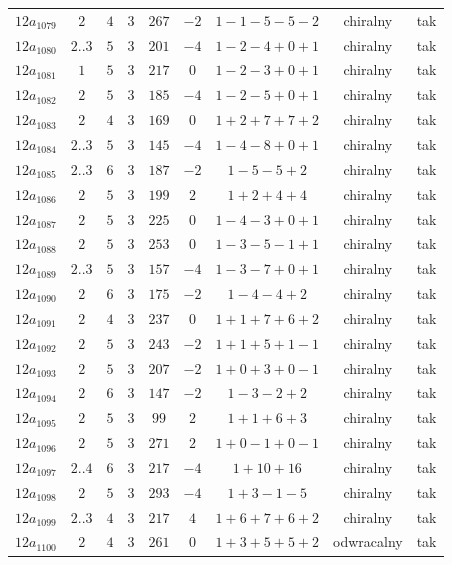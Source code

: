 \begin{longtable}{ccccccccc}
$12a_{1079}$ & $2$ & $4$ & $3$ & $267$ & $-2$ & $1-1-5-5-2$ & chiralny & tak \\
$12a_{1080}$ & $2..3$ & $5$ & $3$ & $201$ & $-4$ & $1-2-4+0+1$ & chiralny & tak \\
$12a_{1081}$ & $1$ & $5$ & $3$ & $217$ & $0$ & $1-2-3+0+1$ & chiralny & tak \\
$12a_{1082}$ & $2$ & $5$ & $3$ & $185$ & $-4$ & $1-2-5+0+1$ & chiralny & tak \\
$12a_{1083}$ & $2$ & $4$ & $3$ & $169$ & $0$ & $1+2+7+7+2$ & chiralny & tak \\
$12a_{1084}$ & $2..3$ & $5$ & $3$ & $145$ & $-4$ & $1-4-8+0+1$ & chiralny & tak \\
$12a_{1085}$ & $2..3$ & $6$ & $3$ & $187$ & $-2$ & $1-5-5+2$ & chiralny & tak \\
$12a_{1086}$ & $2$ & $5$ & $3$ & $199$ & $2$ & $1+2+4+4$ & chiralny & tak \\
$12a_{1087}$ & $2$ & $5$ & $3$ & $225$ & $0$ & $1-4-3+0+1$ & chiralny & tak \\
$12a_{1088}$ & $2$ & $5$ & $3$ & $253$ & $0$ & $1-3-5-1+1$ & chiralny & tak \\
$12a_{1089}$ & $2..3$ & $5$ & $3$ & $157$ & $-4$ & $1-3-7+0+1$ & chiralny & tak \\
$12a_{1090}$ & $2$ & $6$ & $3$ & $175$ & $-2$ & $1-4-4+2$ & chiralny & tak \\
$12a_{1091}$ & $2$ & $4$ & $3$ & $237$ & $0$ & $1+1+7+6+2$ & chiralny & tak \\
$12a_{1092}$ & $2$ & $5$ & $3$ & $243$ & $-2$ & $1+1+5+1-1$ & chiralny & tak \\
$12a_{1093}$ & $2$ & $5$ & $3$ & $207$ & $-2$ & $1+0+3+0-1$ & chiralny & tak \\
$12a_{1094}$ & $2$ & $6$ & $3$ & $147$ & $-2$ & $1-3-2+2$ & chiralny & tak \\
$12a_{1095}$ & $2$ & $5$ & $3$ & $99$ & $2$ & $1+1+6+3$ & chiralny & tak \\
$12a_{1096}$ & $2$ & $5$ & $3$ & $271$ & $2$ & $1+0-1+0-1$ & chiralny & tak \\
$12a_{1097}$ & $2..4$ & $6$ & $3$ & $217$ & $-4$ & $1+10+16$ & chiralny & tak \\
$12a_{1098}$ & $2$ & $5$ & $3$ & $293$ & $-4$ & $1+3-1-5$ & chiralny & tak \\
$12a_{1099}$ & $2..3$ & $4$ & $3$ & $217$ & $4$ & $1+6+7+6+2$ & chiralny & tak \\
$12a_{1100}$ & $2$ & $4$ & $3$ & $261$ & $0$ & $1+3+5+5+2$ & odwracalny & tak \\

\end{longtable}

